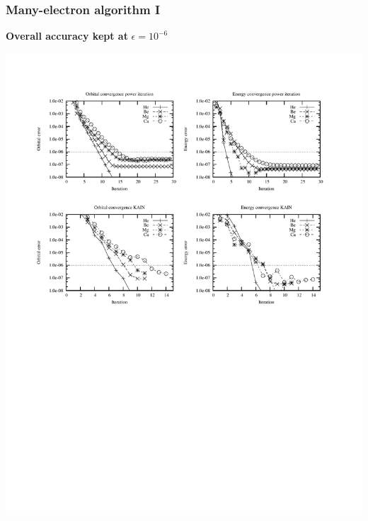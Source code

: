 \documentclass[mathserif, 10pt]{beamer}
\begin{document}
\begin{frame}
    \frametitle{Many-electron algorithm I}
    \centering
    \textbf{Overall accuracy kept at} $\epsilon = 10^{-6}$
    \begin{center}
	\includegraphics[scale=1.0, clip, viewport = 50 550 300 740]{figures/accuracy.pdf}
    \end{center}
\end{frame}
\end{document}
